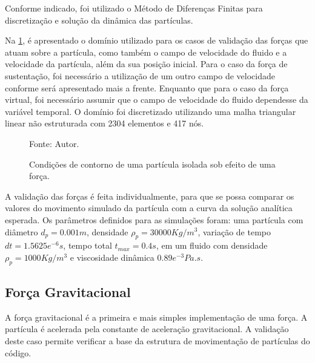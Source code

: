 Conforme indicado, foi utilizado o Método de Diferenças Finitas para discretização e solução da dinâmica das partículas.

Na \ref{force_bc}, é apresentado o domínio utilizado para os casos de validação das forças que atuam sobre a partícula, como também o campo de velocidade do fluido e a velocidade da partícula, além da sua posição inicial.
Para o caso da força de sustentação, foi necessário a utilização de um outro campo de velocidade conforme será apresentado mais a frente.
Enquanto que para o caso da força virtual, foi necessário assumir que o campo de velocidade do fluido dependesse da variável temporal.
O domínio foi discretizado utilizando uma malha triangular linear não estruturada com 2304 elementos e 417 nós.
\begin{figure}[H]
    \centering
     {\raggedleft \scriptsize Fonte: Autor.}
    \caption{Condições de contorno de uma partícula isolada sob efeito de uma força.}
    \label{force_bc}
\end{figure}

A validação das forças é feita individualmente, para que se possa comparar os valores do movimento simulado da partícula com a curva da solução analítica esperada.
Os parâmetros definidos para as simulações foram: uma partícula com diâmetro $d_p=0.001m$, densidade $\rho_p=30000Kg/m^3$, variação de tempo $dt=1.5625e^{-6}s$, tempo total $t_{max}=0.4s$, em um fluido com densidade $\rho_p=1000Kg/m^3$ e viscosidade dinâmica $0.89e^{-3}Pa.s$.

\subsection{\textbf{Força Gravitacional}}
\label{sec_grav}
A força gravitacional é a primeira e mais simples implementação de uma força.
A partícula é acelerada pela constante de aceleração gravitacional.
A validação deste caso permite verificar a base da estrutura de movimentação de partículas do código.

